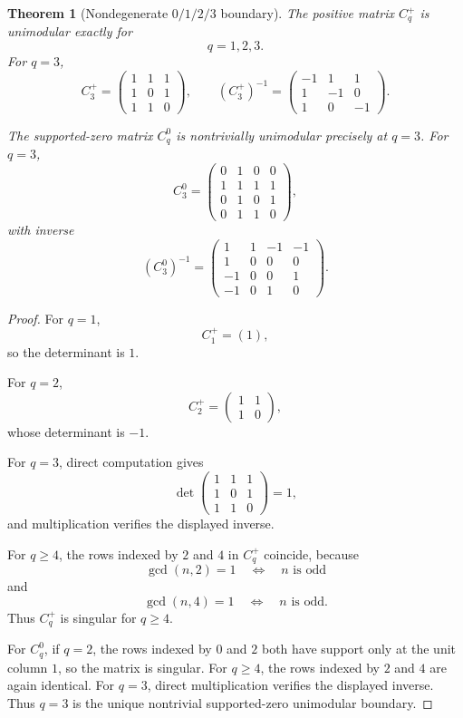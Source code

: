 \documentclass[11pt]{article}
\newtheorem{theorem}{Theorem}[section]
\begin{document}
\begin{theorem}[Nondegenerate \(0/1/2/3\) boundary]
The positive matrix \(C_q^+\) is unimodular exactly for
\[
q=1,2,3.
\]
For \(q=3\),
\[
C_3^+
=
\begin{pmatrix}
1&1&1\\
1&0&1\\
1&1&0
\end{pmatrix},
\qquad
(C_3^+)^{-1}
=
\begin{pmatrix}
-1&1&1\\
1&-1&0\\
1&0&-1
\end{pmatrix}.
\]

The supported-zero matrix \(C_q^0\) is nontrivially unimodular precisely at \(q=3\). For \(q=3\),
\[
C_3^0=
\begin{pmatrix}
0&1&0&0\\
1&1&1&1\\
0&1&0&1\\
0&1&1&0
\end{pmatrix},
\]
with inverse
\[
(C_3^0)^{-1}=
\begin{pmatrix}
1&1&-1&-1\\
1&0&0&0\\
-1&0&0&1\\
-1&0&1&0
\end{pmatrix}.
\]
\end{theorem}

\begin{proof}
For \(q=1\),
\[
C_1^+=(1),
\]
so the determinant is \(1\).

For \(q=2\),
\[
C_2^+=
\begin{pmatrix}
1&1\\
1&0
\end{pmatrix},
\]
whose determinant is \(-1\).

For \(q=3\), direct computation gives
\[
\det
\begin{pmatrix}
1&1&1\\
1&0&1\\
1&1&0
\end{pmatrix}
=1,
\]
and multiplication verifies the displayed inverse.

For \(q\ge4\), the rows indexed by \(2\) and \(4\) in \(C_q^+\) coincide, because
\[
\gcd(n,2)=1
\quad\Longleftrightarrow\quad
n\text{ is odd}
\]
and
\[
\gcd(n,4)=1
\quad\Longleftrightarrow\quad
n\text{ is odd}.
\]
Thus \(C_q^+\) is singular for \(q\ge4\).

For \(C_q^0\), if \(q=2\), the rows indexed by \(0\) and \(2\) both have support only at the unit column \(1\), so the matrix is singular. For \(q\ge4\), the rows indexed by \(2\) and \(4\) are again identical. For \(q=3\), direct multiplication verifies the displayed inverse. Thus \(q=3\) is the unique nontrivial supported-zero unimodular boundary.
\end{proof}
\end{document}
